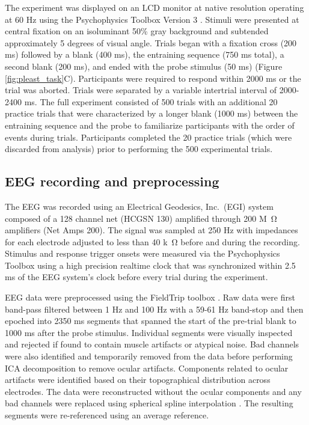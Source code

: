 \documentclass[dwyatte_dissertation.tex]{subfiles}
\begin{document}
The experiment was displayed on an LCD monitor at native resolution operating at 60 Hz using the Psychophysics Toolbox Version 3 \cite{Brainard97,Pelli97}. Stimuli were presented at central fixation on an isoluminant 50\% gray background and subtended approximately 5 degrees of visual angle. Trials began with a fixation cross (200 ms) followed by a blank (400 ms), the entraining sequence (750 ms total), a second blank (200 ms), and ended with the probe stimulus (50 ms) (Figure \ref{fig:pleast_task}C). Participants were required to respond within 2000 ms or the trial was aborted. Trials were separated by a variable intertrial interval of 2000-2400 ms. The full experiment consisted of 500 trials with an additional 20 practice trials that were characterized by a longer blank (1000 ms) between the entraining sequence and the probe to familiarize participants with the order of events during trials. Participants completed the 20 practice trials (which were discarded from analysis) prior to performing the 500 experimental trials. %

\subsection{EEG recording and preprocessing}
The EEG was recorded using an Electrical Geodesics, Inc.~(EGI) system composed of a 128 channel net (HCGSN 130) amplified through 200 M\SI{}{\ohm} amplifiers (Net Amps 200). The signal was sampled at 250 Hz with impedances for each electrode adjusted to less than 40 k\SI{}{\ohm} before and during the recording. Stimulus and response trigger onsets were measured via the Psychophysics Toolbox using a high precision realtime clock that was synchronized within 2.5 ms of the EEG system's clock before every trial during the experiment.

EEG data were preprocessed using the FieldTrip toolbox \cite{OostenveldFriesMarisEtAl11}. Raw data were first band-pass filtered between 1 Hz and 100 Hz with a 59-61 Hz band-stop and then epoched into 2350 ms segments that spanned the start of the pre-trial blank to 1000 ms after the probe stimulus. Individual segments were visually inspected and rejected if found to contain muscle artifacts or atypical noise. Bad channels were also identified and temporarily removed from the data before performing ICA decomposition \cite{DelormeMakeig04} to remove ocular artifacts. Components related to ocular artifacts were identified based on their topographical distribution across electrodes. The data were reconstructed without the ocular components and any bad channels were replaced using spherical spline interpolation \cite{PerrinPernierBertrandEtAl89}. The resulting segments were re-referenced using an average reference.
\end{document}
